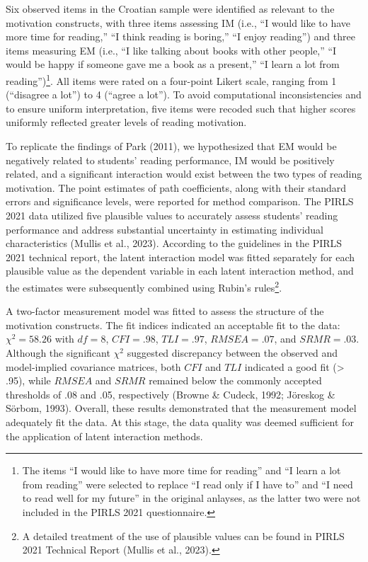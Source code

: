 \documentclass[
  man,mask]{apa6}
\begin{document}
Six observed items in the Croatian sample were identified as relevant to the motivation constructs, with three items assessing IM (i.e., ``I would like to have more time for reading,'' ``I think reading is boring,'' ``I enjoy reading'') and three items measuring EM (i.e., ``I like talking about books with other people,'' ``I would be happy if someone gave me a book as a present,'' ``I learn a lot from reading'')\footnote{The items ``I would like to have more time for reading'' and ``I learn a lot from reading'' were selected to replace ``I read only if I have to'' and ``I need to read well for my future'' in the original anlayses, as the latter two were not included in the PIRLS 2021 questionnaire.}. All items were rated on a four-point Likert scale, ranging from 1 (``disagree a lot'') to 4 (``agree a lot''). To avoid computational inconsistencies and to ensure uniform interpretation, five items were recoded such that higher scores uniformly reflected greater levels of reading motivation.

To replicate the findings of Park (2011), we hypothesized that EM would be negatively related to students' reading performance, IM would be positively related, and a significant interaction would exist between the two types of reading motivation. The point estimates of path coefficients, along with their standard errors and significance levels, were reported for method comparison. The PIRLS 2021 data utilized five plausible values to accurately assess students' reading performance and address substantial uncertainty in estimating individual characteristics (Mullis et al., 2023). According to the guidelines in the PIRLS 2021 technical report, the latent interaction model was fitted separately for each plausible value as the dependent variable in each latent interaction method, and the estimates were subsequently combined using Rubin's rules\footnote{A detailed treatment of the use of plausible values can be found in PIRLS 2021 Technical Report (Mullis et al., 2023).}.

A two-factor measurement model was fitted to assess the structure of the motivation constructs. The fit indices indicated an acceptable fit to the data: \(\chi^2 = 58.26\) with \(\textit{df} = 8\), \(CFI = .98\), \(TLI = .97\), \(RMSEA = .07\), and \(SRMR = .03\). Although the significant \(\chi^2\) suggested discrepancy between the observed and model-implied covariance matrices, both \(CFI\) and \(TLI\) indicated a good fit (\textgreater{} .95), while \(RMSEA\) and \(SRMR\) remained below the commonly accepted thresholds of .08 and .05, respectively (Browne \& Cudeck, 1992; Jöreskog \& Sörbom, 1993). Overall, these results demonstrated that the measurement model adequately fit the data. At this stage, the data quality was deemed sufficient for the application of latent interaction methods.
\end{document}
